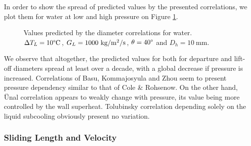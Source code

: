 \npar


In order to show the spread of predicted values by the presented correlations, we plot them for water at low and high pressure on Figure \ref{fig:dlo_correl_spread}.




\begin{figure}[h!]


\caption{Values predicted by the diameter correlations for water. $\Delta T_{L}=10\degree\mathrm{C}$, $G_{L}=1000~\text{kg/m$^{2}$/s}$, $\theta=40\degree$ and $D_{h}=10\ $mm.}
\label{fig:dlo_correl_spread}
\end{figure}

\npar

We observe that altogether, the predicted values for both for departure and lift-off diameters spread at least over a decade, with a global decrease if pressure is increased. Correlations of Basu, Kommajosyula and Zhou seem to present pressure dependency similar to that of Cole \& Rohsenow. On the other hand, \"Unal correlation appears to weakly change with pressure, its value being more controlled by the wall superheat. Tolubinsky correlation depending solely on the liquid subcooling obviously present no variation.



\subsubsection{Sliding Length and Velocity}

